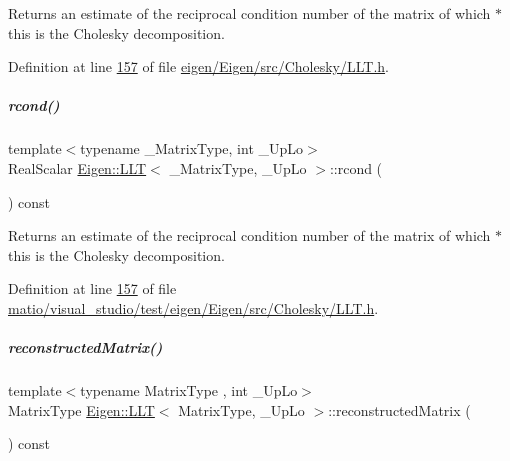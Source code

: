 \begin{DoxyReturn}{Returns}
an estimate of the reciprocal condition number of the matrix of which {\ttfamily $\ast$this} is the Cholesky decomposition. 
\end{DoxyReturn}


Definition at line \hyperlink{eigen_2_eigen_2src_2_cholesky_2_l_l_t_8h_source_l00157}{157} of file \hyperlink{eigen_2_eigen_2src_2_cholesky_2_l_l_t_8h_source}{eigen/\+Eigen/src/\+Cholesky/\+L\+L\+T.\+h}.

\mbox{\label{group___cholesky___module_a59338fa78db171d02fd5a2c9e4f3a30c}} 
\subparagraph{\texorpdfstring{rcond()}{rcond()}\hspace{0.1cm}{\footnotesize\ttfamily [2/2]}}
{\footnotesize\ttfamily template$<$typename \+\_\+\+Matrix\+Type, int \+\_\+\+Up\+Lo$>$ \\
Real\+Scalar \hyperlink{group___cholesky___module_class_eigen_1_1_l_l_t}{Eigen\+::\+L\+LT}$<$ \+\_\+\+Matrix\+Type, \+\_\+\+Up\+Lo $>$\+::rcond (\begin{DoxyParamCaption}{ }\end{DoxyParamCaption}) const\hspace{0.3cm}{\ttfamily [inline]}}

\begin{DoxyReturn}{Returns}
an estimate of the reciprocal condition number of the matrix of which {\ttfamily $\ast$this} is the Cholesky decomposition. 
\end{DoxyReturn}


Definition at line \hyperlink{matio_2visual__studio_2test_2eigen_2_eigen_2src_2_cholesky_2_l_l_t_8h_source_l00157}{157} of file \hyperlink{matio_2visual__studio_2test_2eigen_2_eigen_2src_2_cholesky_2_l_l_t_8h_source}{matio/visual\+\_\+studio/test/eigen/\+Eigen/src/\+Cholesky/\+L\+L\+T.\+h}.

\mbox{\label{group___cholesky___module_a8b6ba1bc41811c50e65cac8db597d802}} 
\subparagraph{\texorpdfstring{reconstructed\+Matrix()}{reconstructedMatrix()}}
{\footnotesize\ttfamily template$<$typename Matrix\+Type , int \+\_\+\+Up\+Lo$>$ \\
Matrix\+Type \hyperlink{group___cholesky___module_class_eigen_1_1_l_l_t}{Eigen\+::\+L\+LT}$<$ Matrix\+Type, \+\_\+\+Up\+Lo $>$\+::reconstructed\+Matrix (\begin{DoxyParamCaption}{ }\end{DoxyParamCaption}) const}

